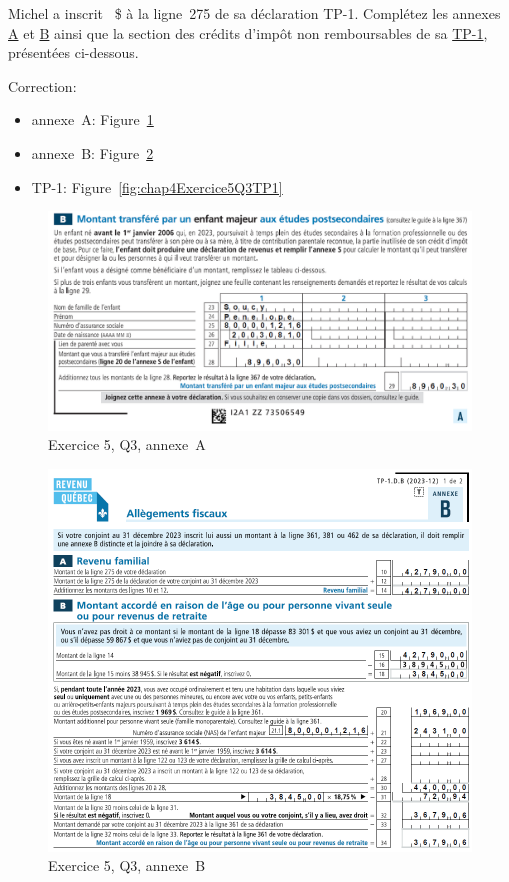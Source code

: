 \begin{sousQuestion}
	Michel a inscrit ~\$ à la ligne~275 de sa déclaration TP-1. Complétez les annexes \href{https://www.revenuquebec.ca/documents/fr/formulaires/tp/2023-12/TP-1.D.A%282023-12%29.pdf}{A} et \href{https://www.revenuquebec.ca/documents/fr/formulaires/tp/2023-12/TP-1.D.B%282023-12%29.pdf}{B} ainsi que la section des crédits d'impôt non remboursables de sa \href{https://www.revenuquebec.ca/documents/fr/formulaires/tp/2023-12/TP-1.D%282023-12%29.pdf}{TP-1}, présentées ci-dessous.
\end{sousQuestion}
Correction:
\begin{itemize}
	\item annexe~A: Figure~\ref{fig:chap4Exercice5Q3AnnexeA}
	\item annexe~B: Figure~\ref{fig:chap4Exercice5Q3AnnexeB}
	\item TP-1: Figure~\ref{fig:chap4Exercice5Q3TP1}
\end{itemize}
\begin{figure}
	\centering
	\includegraphics[width=.9\textwidth]{exercice/4-5/Q3/Annexe-A.png}
	\caption[]{Exercice 5, Q3, annexe~A}
	\label{fig:chap4Exercice5Q3AnnexeA}
\end{figure}
\begin{figure}
	\centering
	\includegraphics[width=.9\textwidth]{exercice/4-5/Q3/Annexe-B.png}
	\caption[]{Exercice 5, Q3, annexe~B}
	\label{fig:chap4Exercice5Q3AnnexeB}
\end{figure}

